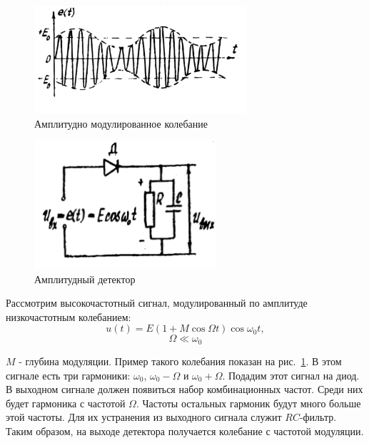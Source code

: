 \begin{figure}[h!]
	\centering
	\includegraphics[width=0.7\textwidth]{picture/pic8.jpg}
	\caption{Амплитудно модулированное колебание}
	\label{pic:8}
\end{figure}

\begin{figure}[h!]
	\centering
	\includegraphics[width=0.6\textwidth]{picture/pic9.jpg}
	\caption{Амплитудный детектор}
	\label{pic:9}
\end{figure}
Рассмотрим высокочастотный сигнал, модулированный по амплитуде низкочастотным колебанием:
$$u(t)=E(1+M\cos{\Omega t})\cos{\omega_0 t},$$  $$\Omega \ll \omega_0 $$

$M$ - глубина модуляции. Пример такого колебания показан на рис.~\ref{pic:8}. В этом сигнале есть три гармоники: $ \omega_0 $, $ \omega_0 - \Omega$ и $\omega_0 + \Omega$. Подадим этот сигнал на диод. В выходном сигнале должен появиться набор комбинационных частот. Среди них будет гармоника с частотой $\Omega$. Частоты остальных гармоник будут много больше этой частоты. Для их устранения из выходного сигнала служит $RC$-фильтр. Таким образом, на выходе детектора получается колебание с частотой модуляции.

